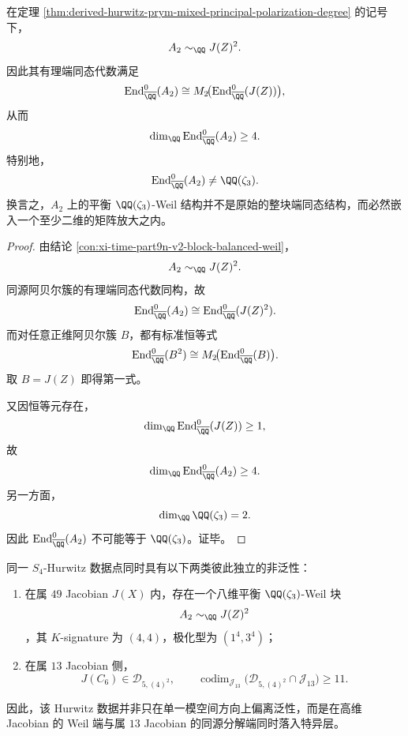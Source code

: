 \begin{corollary}\label{cor:derived-hurwitz-v2-weil-nonprimitive}
在定理 \ref{thm:derived-hurwitz-prym-mixed-principal-polarization-degree} 的记号下，
\[
A_2\sim_{\QQ}J(Z)^2.
\]
因此其有理端同态代数满足
\[
\operatorname{End}^0_{\overline{\QQ}}(A_2)
\cong
M_2\!\bigl(\operatorname{End}^0_{\overline{\QQ}}(J(Z))\bigr),
\]
从而
\[
\dim_{\QQ}\operatorname{End}^0_{\overline{\QQ}}(A_2)\ge 4.
\]
特别地，
\[
\operatorname{End}^0_{\overline{\QQ}}(A_2)\neq \QQ(\zeta_3).
\]
换言之，\(A_2\) 上的平衡 \(\QQ(\zeta_3)\)-Weil 结构并不是原始的整块端同态结构，而必然嵌入一个至少二维的矩阵放大之内。
\end{corollary}

\begin{proof}
由结论 \ref{con:xi-time-part9n-v2-block-balanced-weil}，
\[
A_2\sim_{\QQ}J(Z)^2.
\]
同源阿贝尔簇的有理端同态代数同构，故
\[
\operatorname{End}^0_{\overline{\QQ}}(A_2)
\cong
\operatorname{End}^0_{\overline{\QQ}}(J(Z)^2).
\]
而对任意正维阿贝尔簇 \(B\)，都有标准恒等式
\[
\operatorname{End}^0_{\overline{\QQ}}(B^2)\cong
M_2\!\bigl(\operatorname{End}^0_{\overline{\QQ}}(B)\bigr).
\]
取 \(B=J(Z)\) 即得第一式。

又因恒等元存在，
\[
\dim_{\QQ}\operatorname{End}^0_{\overline{\QQ}}(J(Z))\ge 1,
\]
故
\[
\dim_{\QQ}\operatorname{End}^0_{\overline{\QQ}}(A_2)\ge 4.
\]
另一方面，
\[
\dim_{\QQ}\QQ(\zeta_3)=2.
\]
因此 \(\operatorname{End}^0_{\overline{\QQ}}(A_2)\) 不可能等于 \(\QQ(\zeta_3)\)。证毕。
\end{proof}

\begin{corollary}\label{cor:derived-hurwitz-double-nongenericity}
同一 \(S_4\)-Hurwitz 数据点同时具有以下两类彼此独立的非泛性：
\begin{enumerate}
\normalfont
  \item 在属 \(49\) Jacobian \(J(X)\) 内，存在一个八维平衡
  \(\QQ(\zeta_3)\)-Weil 块
  \[
  A_2\sim_{\QQ}J(Z)^2
  \]
  ，其 \(K\)-signature 为 \((4,4)\)，极化型为 \((1^4,3^4)\)；
  \item 在属 \(13\) Jacobian 侧，
  \[
  J(C_6)\in \mathcal D_{5,(4)^2},
  \qquad
  \operatorname{codim}_{\mathcal J_{13}}
  \bigl(\mathcal D_{5,(4)^2}\cap \mathcal J_{13}\bigr)\ge 11.
  \]
\end{enumerate}
因此，该 Hurwitz 数据并非只在单一模空间方向上偏离泛性，而是在高维 Jacobian 的 Weil 端与属 \(13\) Jacobian 的同源分解端同时落入特异层。
\end{corollary}

